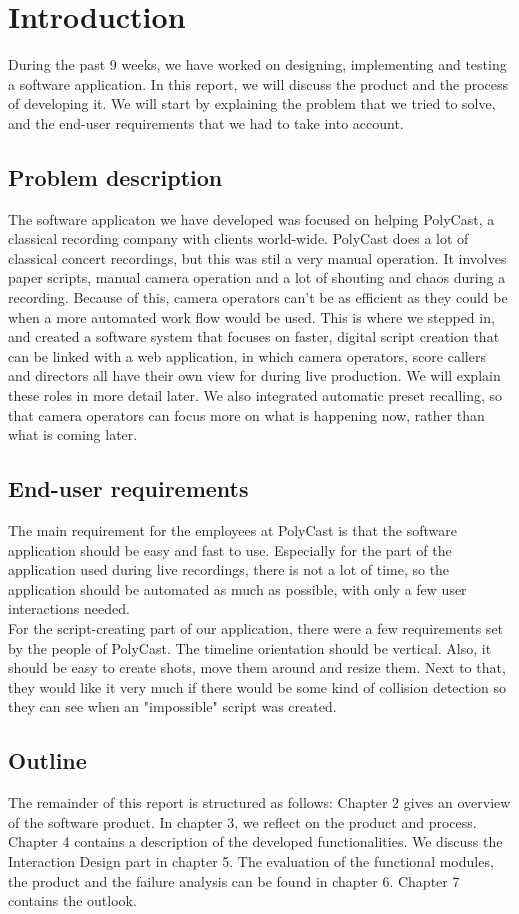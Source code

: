 \section{Introduction}

During the past 9 weeks, we have worked on designing, implementing and testing a software application. In this report, we will discuss the product and the process of developing it. We will start by explaining the problem that we tried to solve, and the end-user requirements that we had to take into account.

\subsection*{Problem description}
The software applicaton we have developed was focused on helping PolyCast, a classical recording company with clients world-wide. PolyCast does a lot of classical concert recordings, but this was stil a very manual operation. It involves paper scripts, manual camera operation and a lot of shouting and chaos during a recording. Because of this, camera operators can't be as efficient as they could be when a more automated work flow would be used. This is where we stepped in, and created a software system that focuses on faster, digital script creation that can be linked with a web application, in which camera operators, score callers and directors all have their own view for during live production. We will explain these roles in more detail later. We also integrated automatic preset recalling, so that camera operators can focus more on what is happening now, rather than what is coming later.

\subsection*{End-user requirements}
The main requirement for the employees at PolyCast is that the software application should be easy and fast to use. Especially for the part of the application used during live recordings, there is not a lot of time, so the application should be automated as much as possible, with only a few user interactions needed.\\
For the script-creating part of our application, there were a few requirements set by the people of PolyCast. The timeline orientation should be vertical. Also, it should be easy to create shots, move them around and resize them. Next to that, they would like it very much if there would be some kind of collision detection so they can see when an "impossible" script was created.

\subsection*{Outline}
The remainder of this report is structured as follows: Chapter 2 gives an overview of the software product. In chapter 3, we reflect on the product and process. Chapter 4 contains a description of the developed functionalities. We discuss the Interaction Design part in chapter 5. The evaluation of the functional modules, the product and the failure analysis can be found in chapter 6. Chapter 7 contains the outlook.